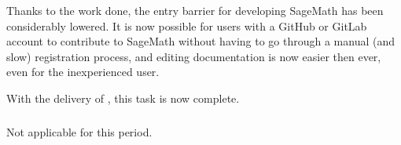   Thanks to the work done, the entry barrier for developing SageMath
  has been considerably lowered. It is now possible for users with a
  GitHub or GitLab account to contribute to SageMath without having to
  go through a manual (and slow) registration process, and editing
  documentation is now easier then ever, even for the inexperienced
  user.

  With the delivery of
  , this task is now
  complete.

  \subparagraph{}
  \label{component-architecture@oommf-python-interface}
  Not applicable for this period.

  

